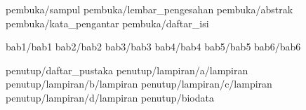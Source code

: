 \documentclass[a5paper, twoside, 11pt, listof=nochaptergap] {book}
\begin{document}

    \pagestyle {normal}

    \frontmatter
     {pembuka/sampul}
     {pembuka/lembar_pengesahan}
     {pembuka/abstrak}
     {pembuka/kata_pengantar}
     {pembuka/daftar_isi}

    \mainmatter
     {bab1/bab1} \cleardoublepage
     {bab2/bab2} \cleardoublepage
     {bab3/bab3} \cleardoublepage
     {bab4/bab4} \cleardoublepage
     {bab5/bab5} \cleardoublepage
     {bab6/bab6} \cleardoublepage

    \backmatter
     {penutup/daftar_pustaka}
     {penutup/lampiran/a/lampiran}
     {penutup/lampiran/b/lampiran}
     {penutup/lampiran/c/lampiran}
     {penutup/lampiran/d/lampiran}
     {penutup/biodata}
\end{document}

